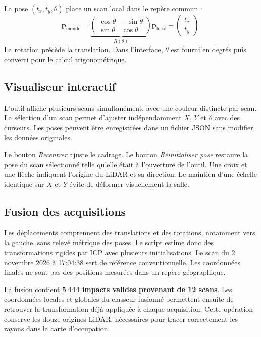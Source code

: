\documentclass[11pt,a4paper]{article}
\newcommand{\code}[1]{\texttt{\detokenize{#1}}}
\begin{document}
La pose $(t_x,t_y,\theta)$ place un scan local dans le repère commun :
\[
 \mathbf p_{\mathrm{monde}}=
 \underbrace{\begin{pmatrix}
 \cos\theta&-\sin\theta\\
 \sin\theta&\cos\theta
 \end{pmatrix}}_{R(\theta)}
 \mathbf p_{\mathrm{local}}+
 \begin{pmatrix}t_x\\t_y\end{pmatrix}.
\]
La rotation précède la translation. Dans l'interface, $\theta$ est fourni
en degrés puis converti pour le calcul trigonométrique.

\subsection{Visualiseur interactif}
L'outil \code{viewer.py} affiche plusieurs scans simultanément, avec une
couleur distincte par scan. La sélection d'un scan permet d'ajuster
indépendamment $X$, $Y$ et $\theta$ avec des curseurs. Les poses peuvent être
enregistrées dans un fichier JSON sans modifier les données originales.

Le bouton \emph{Recentrer} ajuste le cadrage. Le bouton
\emph{Réinitialiser pose} restaure la pose du scan sélectionné telle
qu'elle était à l'ouverture de l'outil. Une croix et une flèche indiquent
l'origine du LiDAR et sa direction. Le maintien d'une échelle identique
sur $X$ et $Y$ évite de déformer visuellement la salle.

\subsection{Fusion des acquisitions}
Les déplacements comprennent des translations et des rotations, notamment
vers la gauche, sans relevé métrique des poses. Le script
\code{merge_scans.py} estime donc des transformations rigides par ICP avec
plusieurs initialisations. Le scan du 2 novembre 2026 à 17:04:38 sert de
référence conventionnelle. Les coordonnées finales ne sont pas des positions
mesurées dans un repère géographique.

La fusion contient \textbf{5\,444 impacts valides provenant de 12 scans}.
Les coordonnées locales et globales du classeur fusionné permettent ensuite
de retrouver la transformation déjà appliquée à chaque acquisition.
Cette opération conserve les douze origines LiDAR, nécessaires pour tracer
correctement les rayons dans la carte d'occupation.
\end{document}
